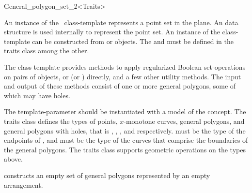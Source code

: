 \ccRefPageBegin

\begin{ccRefClass}{General_polygon_set_2<Traits>}

\ccThreeToTwo
    
\ccDefinition
An instance of the \ccClassTemplateName\ class-template represents a
point set in the plane. An  data structure is used
internally to represent the point set. An instance of the
 class-template can be constructed from 
 or  objects.
The  and  must
be defined in the traits class among the other.

The class template provides methods to apply regularized Boolean 
set-operations on pairs of  objects, or 
 (or ) directly, 
and a few other utility methods. 
The input and output of these methods consist of one or more general 
polygons, some of which may have holes.

The  template-parameter should be instantiated with a
model of the  concept. The traits class
defines the types of points, $x$-monotone curves, general polygons,
and general polygons with holes, that is ,
, , and
 respectively.  must
be the type of the endpoints of , and
 must be the type of the curves that comprise
the boundaries of the general polygons. The traits class supports
geometric operations on the types above.

\ccTypes
\ccGlue
{}
\ccGlue
{} 


\ccCreation
{}

\ccThreeToTwo
    
  {constructs an empty set of general polygons represented by an
  empty arrangement.}
    

\end{ccRefClass}
